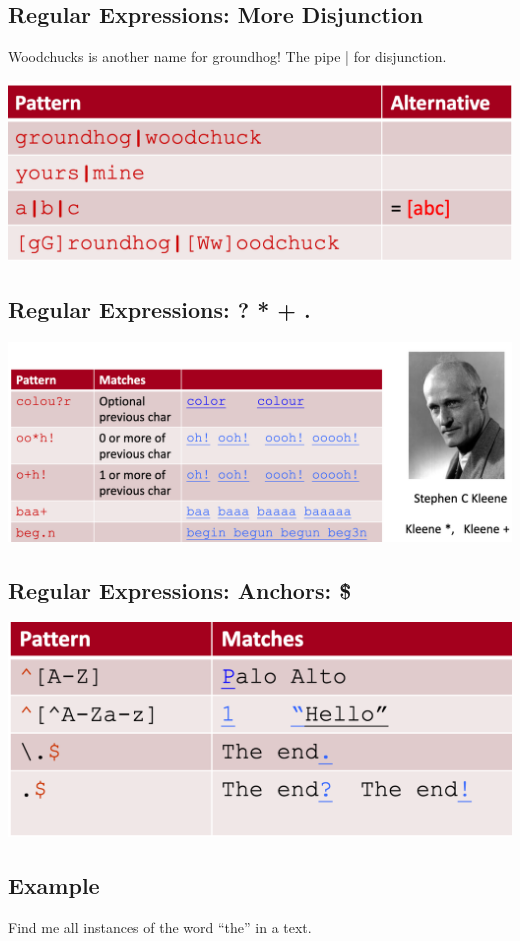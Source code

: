 \documentclass[11pt]{article}
\theoremstyle{definition}
\begin{document}
\subsection{Regular Expressions: More Disjunction}
Woodchucks is another name for groundhog! The pipe | for disjunction.

\includegraphics[width=\textwidth]{10.png}

\subsection{Regular Expressions: ? * + .}
\includegraphics[width=\textwidth]{11.png}

\subsection{Regular Expressions: Anchors: \^ \$}
\includegraphics[width=\textwidth]{12.png}

\subsection{Example}
Find me all instances of the word “the” in a text.
\end{document}
